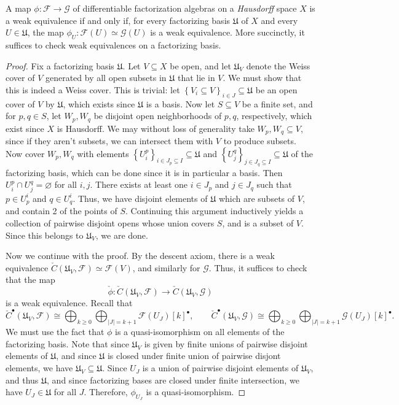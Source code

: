 \begin{lemma}\label{lma:6-1-18}
	A map $\phi : \mathcal{F}  \to \mathcal{G} $ of differentiable factorization algebras on a \emph{Hausdorff} space $X$ is a weak equivalence if and only if, for every factorizing basis $\mathfrak{U} $ of $X$ and every $U\in \mathfrak{U} $, the map $\phi _U : \mathcal{F} (U)\simeq \mathcal{G} (U)$ is a weak equivalence. More succinctly, it suffices to check weak equivalences on a factorizing basis.
\end{lemma}
\begin{proof}
	Fix a factorizing basis $\mathfrak{U} $. Let $V\subseteq X$ be open, and let $\mathfrak{U} _V$ denote the Weiss cover of $V$ generated by all open subsets in $\mathfrak{U} $ that lie in $V$. We must show that this is indeed a Weiss cover. This is trivial: let $\left\{ V_i \subseteq V\right\} _{i\in J}\subseteq \mathfrak{U}  $ be an open cover of $V$ by $\mathfrak{U} $, which exists since $\mathfrak{U} $ is a basis. Now let $S\subseteq V$ be a finite set, and for $p,q\in S$, let $W_p,W_q$ be disjoint open neighborhoods of $p,q$, respectively, which exist since $X$ is Hausdorff. We may without loss of generality take $W_p,W_q \subseteq V$, since if they aren't subsets, we can intersect them with $V$ to produce subsets. Now cover $W_p,W_q$ with elements $\left\{ U_i^p \right\} _{i\in J_p \subseteq I} \subseteq \mathfrak{U} $ and $\left\{ U_j^q \right\}_{j\in J_q \subseteq I} \subseteq \mathfrak{U} $ of the factorizing basis, which can be done since it is in particular a basis. Then $U_i^p \cap U_j^q = \varnothing $ for all $i,j$. There exists at least one $i\in J_p$ and $j\in J_q$ such that $p\in U_p^i$ and $q\in U_q^i$. Thus, we have disjoint elements of $\mathfrak{U} $ which are subsets of $V$, and contain 2 of the points of $S$. Continuing this argument inductively yields a collection of pairwise disjoint opens whose union covers $S$, and is a subset of $V$. Since this belongs to $\mathfrak{U} _V$, we are done.

	Now we continue with the proof. By the descent axiom, there is a weak equivalence $\check{C}(\mathfrak{U} _V,\mathcal{F})\simeq \mathcal{F}(V)$, and similarly for $\mathcal{G}$. Thus, it suffices to check that the map
	\[
		\check{\phi }: \check{C}(\mathfrak{U}_V,\mathcal{F}) \to \check{C}(\mathfrak{U} _V,\mathcal{G})
	\]
	is a weak equivalence. Recall that
	\[
		\check{C}^{\bullet}(\mathfrak{U}_V,\mathcal{F} )\cong \bigoplus_{k\geq 0} \bigoplus_{\left| J \right| =k+1} \mathcal{F} (U_J)[k]^{\bullet},\qquad \check{C}^{\bullet} (\mathfrak{U}_V,\mathcal{G} )\cong \bigoplus_{k\geq 0} \bigoplus_{\left| J \right|=k+1} \mathcal{G} (U_J)[k]^{\bullet} .
	\]
	We must use the fact that $\phi $ is a quasi-isomorphism on all elements of the factorizing basis. Note that since $\mathfrak{U} _V$ is given by finite unions of pairwise disjoint elements of $\mathfrak{U} $, and since $\mathfrak{U} $ is closed under finite union of pairwise disjont elements, we have $\mathfrak{U} _V \subseteq \mathfrak{U}$. Since $U_J$ is a union of pairwise disjoint elements of $\mathfrak{U} _V$, and thus $\mathfrak{U} $, and since factorizing bases are closed under finite intersection, we have $U_J\in \mathfrak{U} $ for all $J$. Therefore, $\phi _{U_J} $ is a quasi-isomorphism.


\end{proof}
